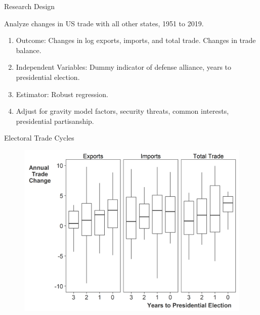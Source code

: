 \documentclass[12pt]{beamer}
\begin{document}

\begin{frame}{Research Design}

\pause
Analyze changes in US trade with all other states, 1951 to 2019. 
\pause
\begin{enumerate}
\item Outcome: Changes in log exports, imports, and total trade. Changes in trade balance.  
\pause
\item Independent Variables: Dummy indicator of defense alliance, years to presidential election.
\pause 
\item Estimator: Robust regression. 
\pause 
\item Adjust for gravity model factors, security threats, common interests, presidential partisanship.
\end{enumerate} 

\end{frame} 


\begin{frame}{Electoral Trade Cycles}

\begin{figure}[htbp]
	\centering
		\includegraphics[height=.9\textheight]{us-trade-cycles.png}
\end{figure}


\end{frame} 


\end{document}
